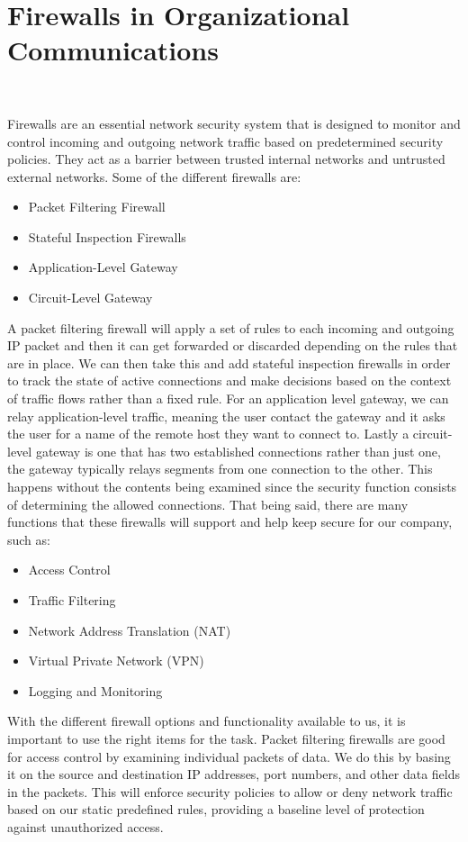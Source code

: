 \documentclass[12pt,a4paper]{report}
\begin{document}
\section{Firewalls in Organizational Communications}
\

Firewalls are an essential network security system that is designed to monitor and control incoming and outgoing network traffic based on predetermined security policies. 
They act as a barrier between trusted internal networks and untrusted external networks.
Some of the different firewalls are:
\begin{itemize}
 \item Packet Filtering Firewall
 \item Stateful Inspection Firewalls
 \item Application-Level Gateway
 \item Circuit-Level Gateway
\end{itemize}

A packet filtering firewall will apply a set of rules to each incoming and outgoing IP packet and then it can get forwarded or discarded depending on the rules that are in place.
We can then take this and add stateful inspection firewalls in order to track the state of active connections and make decisions based on the context of traffic flows rather than a fixed rule.
For an application level gateway, we can relay application-level traffic, meaning the user contact the gateway and it asks the user for a name of the remote host they want to connect to.
Lastly a circuit-level gateway is one that has two established connections rather than just one, the gateway typically relays segments from one connection to the other.
This happens without the contents being examined since the security function consists of determining the allowed connections.
That being said, there are many functions that these firewalls will support and help keep secure for our company, such as:
\begin{itemize}
 \item Access Control
 \item Traffic Filtering
 \item Network Address Translation (NAT)
 \item Virtual Private Network (VPN)
 \item Logging and Monitoring
\end{itemize}

With the different firewall options and functionality available to us, it is important to use the right items for the task.
Packet filtering firewalls are good for access control by examining individual packets of data. 
We do this by basing it on the source and destination IP addresses, port numbers, and other data fields in the packets. 
This will enforce security policies to allow or deny network traffic based on our static predefined rules, providing a baseline level of protection against unauthorized access.
\end{document}
